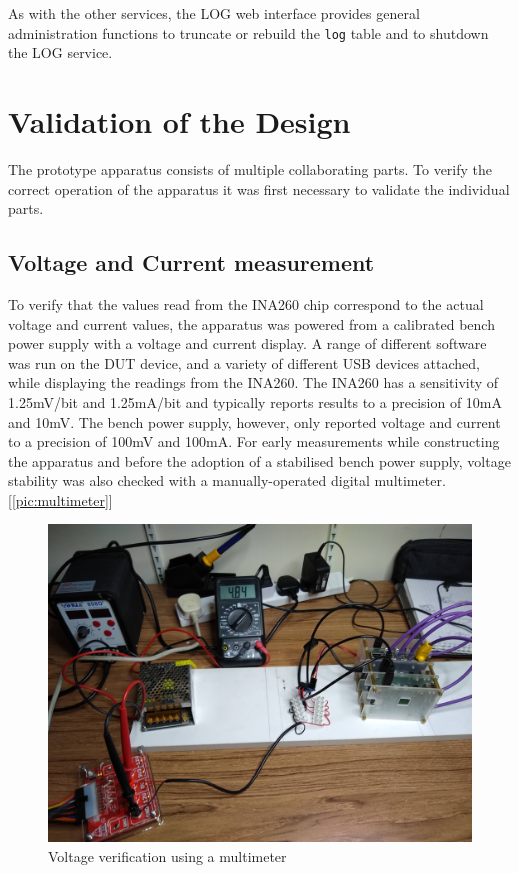 As with the other services, the LOG web interface provides general administration functions to truncate or rebuild the \verb!log! table and to shutdown the LOG service.

\section{Validation of the Design}
\label{validation}

The prototype apparatus consists of multiple collaborating parts. To verify the correct operation of the apparatus it was first necessary to validate the individual parts.

\subsection{Voltage and Current measurement}

To verify that the values read from the INA260 chip correspond to the actual voltage and current values, the apparatus was powered from a calibrated bench power supply with a voltage and current display. A range of different software was run on the DUT device, and a variety of different USB devices attached,  while displaying the readings from the INA260. The INA260 has a sensitivity of 1.25mV/bit and 1.25mA/bit and typically reports results to a precision of 10mA and 10mV. The bench power supply, however, only reported voltage and current to a precision of 100mV and 100mA. For early measurements while constructing the apparatus and before the adoption of a stabilised bench power supply, voltage stability was also checked with a manually-operated digital multimeter. [\autoref{pic:multimeter}]

\begin{figure}[htbp]
  \centering
  \includegraphics[width=\columnwidth]{Figures/rig/rig-multimeter.jpg}
  \caption{Voltage verification using a multimeter}
  \label{pic:multimeter}
\end{figure}

